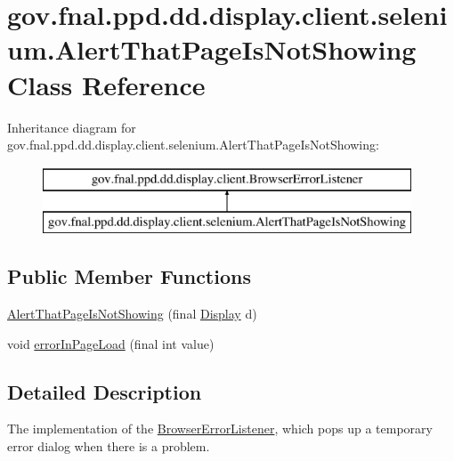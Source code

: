\hypertarget{classgov_1_1fnal_1_1ppd_1_1dd_1_1display_1_1client_1_1selenium_1_1AlertThatPageIsNotShowing}{\section{gov.\-fnal.\-ppd.\-dd.\-display.\-client.\-selenium.\-Alert\-That\-Page\-Is\-Not\-Showing Class Reference}
\label{classgov_1_1fnal_1_1ppd_1_1dd_1_1display_1_1client_1_1selenium_1_1AlertThatPageIsNotShowing}
}
Inheritance diagram for gov.\-fnal.\-ppd.\-dd.\-display.\-client.\-selenium.\-Alert\-That\-Page\-Is\-Not\-Showing\-:\begin{figure}[H]
\begin{center}
\leavevmode
\includegraphics[height=2.000000cm]{classgov_1_1fnal_1_1ppd_1_1dd_1_1display_1_1client_1_1selenium_1_1AlertThatPageIsNotShowing}
\end{center}
\end{figure}
\subsection*{Public Member Functions}
\begin{DoxyCompactItemize}
\item 
\hyperlink{classgov_1_1fnal_1_1ppd_1_1dd_1_1display_1_1client_1_1selenium_1_1AlertThatPageIsNotShowing_a4f9d56ae893432d34ccce59a15af49c1}{Alert\-That\-Page\-Is\-Not\-Showing} (final \hyperlink{interfacegov_1_1fnal_1_1ppd_1_1dd_1_1signage_1_1Display}{Display} d)
\item 
void \hyperlink{classgov_1_1fnal_1_1ppd_1_1dd_1_1display_1_1client_1_1selenium_1_1AlertThatPageIsNotShowing_a2830890a7364d6ce4a328cda1a784fa0}{error\-In\-Page\-Load} (final int value)
\end{DoxyCompactItemize}


\subsection{Detailed Description}
The implementation of the \hyperlink{interfacegov_1_1fnal_1_1ppd_1_1dd_1_1display_1_1client_1_1BrowserErrorListener}{Browser\-Error\-Listener}, which pops up a temporary error dialog when there is a problem.

